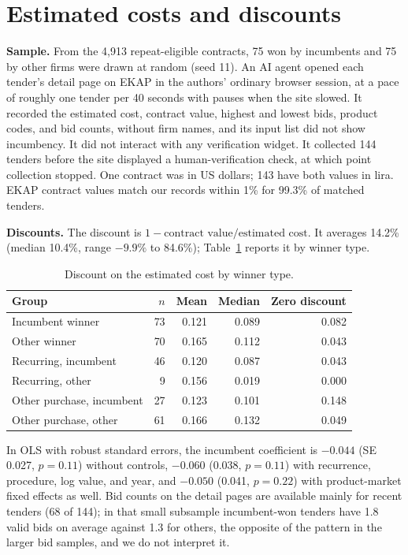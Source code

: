 \documentclass[11pt,a4paper]{article}
\newcommand{\botrule}{\bottomrule}
\begin{document}
\section{Estimated costs and discounts}
\textbf{Sample.} From the 4,913 repeat-eligible contracts, 75 won by incumbents and 75 by other firms were drawn at random (seed 11). An AI agent opened each tender's detail page on EKAP in the authors' ordinary browser session, at a pace of roughly one tender per 40 seconds with pauses when the site slowed. It recorded the estimated cost, contract value, highest and lowest bids, product codes, and bid counts, without firm names, and its input list did not show incumbency. It did not interact with any verification widget. It collected 144 tenders before the site displayed a human-verification check, at which point collection stopped. One contract was in US dollars; 143 have both values in lira. EKAP contract values match our records within 1\% for 99.3\% of matched tenders.

\textbf{Discounts.} The discount is $1-\text{contract value}/\text{estimated cost}$. It averages 14.2\% (median 10.4\%, range $-9.9\%$ to 84.6\%); Table~\ref{tab:disc} reports it by winner type.

\begin{table}[h]\centering\small
\caption{Discount on the estimated cost by winner type.}\label{tab:disc}
\begin{tabular}{@{}lrrrr@{}}
\toprule
Group & $n$ & Mean & Median & Zero discount\\
\midrule
Incumbent winner & 73 & 0.121 & 0.089 & 0.082\\
Other winner & 70 & 0.165 & 0.112 & 0.043\\
Recurring, incumbent & 46 & 0.120 & 0.087 & 0.043\\
Recurring, other & 9 & 0.156 & 0.019 & 0.000\\
Other purchase, incumbent & 27 & 0.123 & 0.101 & 0.148\\
Other purchase, other & 61 & 0.166 & 0.132 & 0.049\\
\botrule
\end{tabular}
\end{table}

In OLS with robust standard errors, the incumbent coefficient is $-0.044$ (SE 0.027, $p=0.11$) without controls, $-0.060$ (0.038, $p=0.11$) with recurrence, procedure, log value, and year, and $-0.050$ (0.041, $p=0.22$) with product-market fixed effects as well. Bid counts on the detail pages are available mainly for recent tenders (68 of 144); in that small subsample incumbent-won tenders have 1.8 valid bids on average against 1.3 for others, the opposite of the pattern in the larger bid samples, and we do not interpret it.
\end{document}
